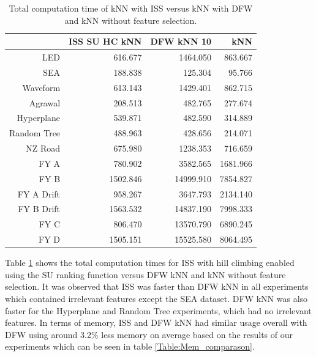 \begin{table}[h]
\centering
\begin{tabular}{r|rrr}
            & ISS SU HC kNN & DFW kNN 10 & kNN         \\ \hline
LED         & 616.677          & 1464.050   & 863.667  \\
SEA         & 188.838          & 125.304    & 95.766   \\
Waveform    & 613.143          & 1429.401   & 862.715  \\
Agrawal     & 208.513          & 482.765    & 277.674  \\
Hyperplane  & 539.871          & 482.590    & 314.889  \\
Random Tree & 488.963          & 428.656    & 214.071  \\
NZ Road     & 675.980          & 1238.353   & 716.659  \\
FY A        & 780.902          & 3582.565   & 1681.966 \\
FY B        & 1502.846         & 14999.910  & 7854.827 \\
FY A Drift  & 958.267          & 3647.793   & 2134.140 \\
FY B Drift  & 1563.532         & 14837.190  & 7998.333 \\
FY C        & 806.470          & 13570.790  & 6890.245 \\
FY D        & 1505.151         & 15525.580  & 8064.495

\end{tabular}
\caption{Total computation time of kNN with ISS versus kNN with DFW and kNN without feature selection.}
\label{Table:Time_comparason}
\end{table}

Table \ref{Table:Time_comparason} shows the total computation times for ISS with hill climbing enabled using the SU ranking function versus DFW kNN and kNN without feature selection. It was observed that ISS was faster than DFW kNN in all experiments which contained irrelevant features except the SEA dataset. DFW kNN was also faster for the Hyperplane and Random Tree experiments, which had no irrelevant features. In terms of memory, ISS and DFW kNN had similar usage overall with DFW using around 3.2\% less memory on average based on the results of our experiments which can be seen in table \ref{Table:Mem_comparason}.

